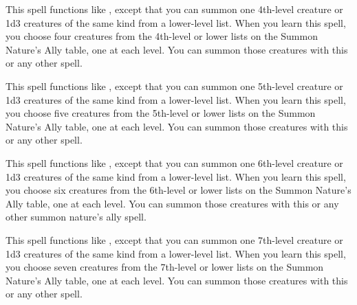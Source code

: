 \begin{spelleffect}
  This spell functions like , except that you can summon one 4th-level creature or 1d3 creatures of the same kind from a lower-level list. When you learn this spell, you choose four creatures from the 4th-level or lower lists on the Summon Nature's Ally table, one at each level. You can summon those creatures with this or any other  spell.
\end{spelleffect}

\begin{spelleffect}
  This spell functions like , except that you can summon one 5th-level creature or 1d3 creatures of the same kind from a lower-level list. When you learn this spell, you choose five creatures from the 5th-level or lower lists on the Summon Nature's Ally table, one at each level. You can summon those creatures with this or any other  spell.
\end{spelleffect}

\begin{spelleffect}
  This spell functions like , except that you can summon one 6th-level creature or 1d3 creatures of the same kind from a lower-level list. When you learn this spell, you choose six creatures from the 6th-level or lower lists on the Summon Nature's Ally table, one at each level. You can summon those creatures with this or any other summon nature's ally spell.
\end{spelleffect}

\begin{spelleffect}
  This spell functions like , except that you can summon one 7th-level creature or 1d3 creatures of the same kind from a lower-level list. When you learn this spell, you choose seven creatures from the 7th-level or lower lists on the Summon Nature's Ally table, one at each level. You can summon those creatures with this or any other  spell.
\end{spelleffect}

